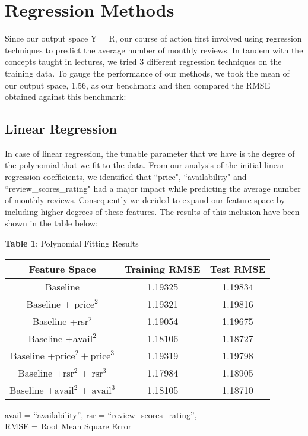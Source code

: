 \documentclass[12pt]{article}
\begin{document}
\section*{Regression Methods}
Since our output space Y = R, our course of action first involved using regression techniques to predict the average number of monthly reviews. In tandem with the concepts taught in lectures, we tried 3 different regression techniques on the training data. To gauge the performance of our methods, we took the mean of our output space, 1.56, as our benchmark and then compared the RMSE obtained against this benchmark:

\subsection*{Linear Regression}
In case of linear regression, the tunable parameter that we have is the degree of the polynomial that we fit to the data. From our analysis of the initial linear regression coefficients, we identified that ``price", ``availability" and ``review\_scores\_rating" had a major impact while predicting the average number of monthly reviews. Consequently we decided to expand our feature space by including higher degrees of these features. The results of this inclusion have been shown in the table below:

\begin{center}
\textbf{Table 1}: Polynomial Fitting Results \\[0.3cm] 
\begin{tabular}{ |c|c|c| } 
 \hline

  \textbf{Feature Space}& \textbf{Training RMSE}  & \textbf{Test RMSE} \\ [0.1cm]
 \hline
 Baseline  &1.19325 &1.19834 \\
 \hline
 Baseline + $\textrm{price}^{2}$ & 1.19321 &1.19816 \\ 
 \hline
 Baseline +$\textrm{rsr}^{2}$ & 1.19054 & 1.19675 \\ 
 \hline
 Baseline +$\textrm{avail}^{2}$  & 1.18106 & 1.18727 \\
 \hline
 Baseline +$\textrm{price}^2 + \textrm{price}^3$ & 1.19319 &1.19798 \\
 \hline
 Baseline +$\textrm{rsr}^{2}$ + $\textrm{rsr}^{3}$  & 1.17984 &1.18905 \\
 \hline
 Baseline +$\textrm{avail}^{2}$ + $\textrm{avail}^{3}$  & 1.18105 &1.18710 \\
 \hline
 

\end{tabular}

avail = ``availability'', rsr = ``review\_scores\_rating'', \\ RMSE = Root Mean Square Error

\end{center}
\end{document}
